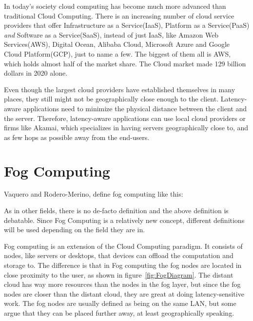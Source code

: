 In today's society cloud computing has become much more advanced than traditional Cloud Computing. There is an increasing number of cloud service providers that offer Infrastructure as a Service(IaaS), Platform as a Service(PaaS) \textit{and} Software as a Service(SaaS), instead of just IaaS, like Amazon Web Services(AWS), Digital Ocean, Alibaba Cloud, Microsoft Azure and Google Cloud Platform(GCP), just to name a few. The biggest of them all is AWS, which holds almost half of the market share\cite{noauthor_cloud_2019}. The Cloud market made 129 billion dollars in 2020 alone\cite{noauthor_cloud_nodate}.

Even though the largest cloud providers have established themselves in many places, they still might not be geographically close enough to the client. Latency-aware applications need to minimize the physical distance between the client and the server. Therefore, latency-aware applications can use local cloud providers or firms like Akamai, which specializes in having servers geographically close to, and as few hops as possible away from the end-users.










\section{Fog Computing}

Vaquero and Rodero-Merino\cite{vaquero_finding_2014}, define fog computing like this: 

As in other fields, there is no de-facto definition and the above definition is debatable. Since Fog Computing is a relatively new concept, different definitions will be used depending on the field they are in.

Fog computing is an extension of the Cloud Computing paradigm. It consists of nodes, like servers or desktops, that devices can offload the computation and storage to. The difference is that in Fog computing the fog nodes are located in close proximity to the user\cite{msftadmin_concept_2020}, as shown in figure~\ref{fig:FogDiagram}. The distant cloud has way more resources than the nodes in the fog layer, but since the fog nodes are closer than the distant cloud, they are great at doing latency-sensitive work. The fog nodes are usually defined as being on the same LAN, but some argue that they can be placed further away, at least geographically speaking. 

